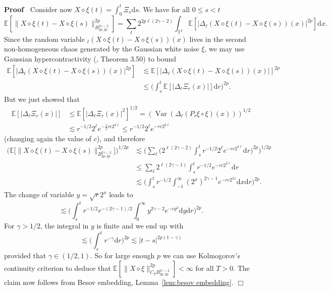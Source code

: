 \documentclass[a4paper,11pt]{article}
\newcommand{\mathd}{\mathrm{d}}
\newcommand{\tmop}[1]{\ensuremath{\operatorname{#1}}}
\newenvironment{proof}{\noindent\textbf{Proof\ }}{\hspace*{\fill}$\Box$\medskip}
\newcommand{\reso}{\,\mathord{\circ}\,}
\newcommand{\renorm}{\,\mathord{\diamond}\,}
\begin{document}
\begin{proof}
  Consider now $X \renorm \xi (t) = \int_0^t \Xi_s \mathd s$. We have for all
  $0 \leqslant s < t$
  \[ \mathbb{E} [\| X \renorm \xi (t) - X \renorm \xi (s) \|_{B^{2 \gamma -
     2}_{2 p, 2 p}}^{2 p}] = \sum_{\ell} 2^{2 p \ell (2 \gamma - 2)}
     \int_{\mathbb{T}^2} \mathbb{E} [| \Delta_{\ell} (X \renorm \xi (t) - X
     \renorm \xi (s)) (x) |^{2 p}] \mathd x. \]
  Since the random variable $_{\ell} (X \renorm \xi (t) - X \renorm \xi (s))
  (x)$ lives in the second non-homogeneous chaos generated by the Gaussian
  white noise $\xi$, we may use Gaussian hypercontractivity
  ({\cite{Janson1997}}, Theorem 3.50) to bound
  \begin{align*}
     \mathbb{E} [| \Delta_{\ell} (X \renorm \xi (t) - X \renorm \xi (s)) (x) |^{2 p}] & \lesssim \mathbb{E} [| \Delta_{\ell} (X \renorm \xi (t) - X \renorm \xi (s)) (x) |]^{2 p} \\
     & \leqslant \Big( \int_s^t \mathbb{E} [| \Delta_{\ell} \Xi_r (x) |] \mathd r \Big)^{2 p}.
  \end{align*}
  But we just showed that
  \begin{align*}
     \mathbb{E} [| \Delta_{\ell} \Xi_r (x) |] & \leqslant \mathbb{E} [| \Delta_{\ell} \Xi_r (x) |^2]^{1 / 2} = (\tmop{Var} (\Delta_{\ell} (P_r \xi \reso \xi) (x)))^{1 / 2} \\
     & \lesssim r^{- 1 / 2} 2^{\ell} e^{- \frac{1}{2} r c 2^{2 \ell}} \leqslant r^{- 1 / 2} 2^{\ell} e^{- r c 2^{2 \ell}}
  \end{align*}
  (changing again the value of $c$), and therefore
  \begin{align*}
    \Big(\mathbb{E} \Big[\| X \renorm \xi (t) - X \renorm \xi (s) \|_{B^{2 \gamma - 2}_{2 p, 2 p}}^{2 p}\Big]\Big)^{1 / 2 p} & \lesssim \Big( \sum_{\ell} \Big( 2^{\ell (2 \gamma - 2)} \int_s^t r^{- 1 / 2} 2^{\ell} e^{- r c 2^{2 \ell}} \mathd r \Big)^{2 p} \Big)^{1 / 2 p} \\
    & \leqslant \sum_{\ell} 2^{\ell (2 \gamma - 1)} \int_s^t r^{- 1 / 2} e^{-
    r c 2^{2 \ell}} \mathd r \\
    & \lesssim \Big( \int_s^t r^{- 1 / 2} \int_{- 1}^{\infty} (2^x)^{2  \gamma - 1} e^{- r c 2^{2 x}} \mathd x \mathd r \Big)^{2 p} .
  \end{align*}
  The change of variable $y = \sqrt{r} 2^x$ leads to
  \[ \lesssim \Big( \int_s^t r^{- 1 / 2} r^{- (2 \gamma - 1) / 2}  \int_0^{\infty} y^{2 \gamma - 2} e^{- c y^2} \mathd y \mathd r \Big)^{2
     p} . \]
  For $\gamma > 1 / 2$, the integral in $y$ is finite and we end up with
  \[ \lesssim \Big( \int_s^t r^{- \gamma} \mathd r \Big)^{2 p} \lesssim | t
     - s |^{2 p (1 - \gamma)} \]
  provided that $\gamma \in (1 / 2, 1)$. So for large enough $p$ we can use
  Kolmogorov's continuity criterion to deduce that $\mathbb{E} [\| X \renorm
  \xi \|_{C_T B^{2 \gamma - 2}_{2 p, 2 p}}^{2 p}] < \infty$ for all $T > 0$.
  The claim now follows from Besov embedding, Lemma~\ref{lem:besov embedding}.
\end{proof}
\end{document}
